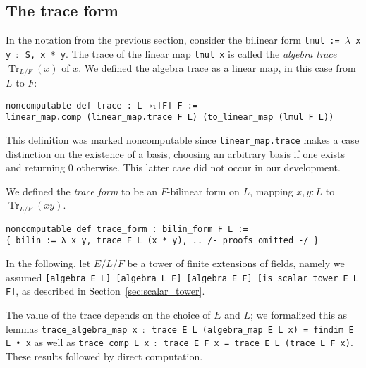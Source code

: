 \documentclass[a4paper,USenglish,cleveref, autoref, thm-restate]{lipics-v2021}
\newcommand{\lean}[1]{\texttt{#1}\xspace} %
\DeclareMathOperator{\Tr}{Tr}
\begin{document}
\subsection{The trace form}\label{sec:trace-form}
In the notation from the previous section, consider the bilinear form \lean{lmul := $\lambda$ x y $:$ S, x~*~y}.
The trace of the linear map \lean{lmul x} is called the \emph{algebra trace} $\Tr_{L / F}(x)$ of $x$.
We defined the algebra trace
as a linear map, in this case from $L$ to $F$:
\begin{lstlisting}
noncomputable def trace : L →ₗ[F] F :=
linear_map.comp (linear_map.trace F L) (to_linear_map (lmul F L))
\end{lstlisting}
This definition was marked noncomputable since \lean{linear\_map.trace} makes a case distinction on the existence of a basis,
choosing an arbitrary basis if one exists and returning $0$ otherwise.
This latter case did not occur in our development.

We defined the \emph{trace form} to be an $F$-bilinear form on $L$, mapping $x, y : L$ to $\Tr_{L/F}(xy)$.
\begin{lstlisting}
noncomputable def trace_form : bilin_form F L :=
{ bilin := λ x y, trace F L (x * y), .. /- proofs omitted -/ }
\end{lstlisting}

In the following, let $E / L / F$ be a tower of finite extensions of fields, namely we assumed \lean{[algebra E L] [algebra L F] [algebra E F] [is\_scalar\_tower E L F]}, as described in Section~\ref{sec:scalar_tower}.

The value of the trace depends on the choice of $E$ and $L$; we formalized this as lemmas \lean{trace\_algebra\_map x $:$ trace E L (algebra\_map E L x) = findim E L • x} as well as \lean{trace\_comp L x $:$ trace E F x = trace E L (trace L F x)}.
These results followed by direct computation.
\end{document}
